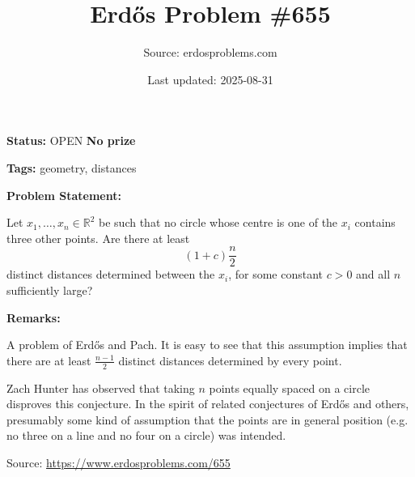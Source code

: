 \documentclass{article}
\title{Erd\H{o}s Problem \#655}
\date{Last updated: 2025-08-31}
\author{Source: erdosproblems.com}
\begin{document}
\maketitle

\noindent\textbf{Status:} OPEN \quad \textbf{No prize}

\noindent\textbf{Tags:} geometry, distances

\medskip
\noindent\textbf{Problem Statement:}

Let $x_1,\ldots,x_n\in \mathbb{R}^2$ be such that no circle whose centre is one of the $x_i$ contains three other points. Are there at least\[(1+c)\frac{n}{2}\]distinct distances determined between the $x_i$, for some constant $c>0$ and all $n$ sufficiently large?

\bigskip
\noindent\textbf{Remarks:}

A problem of Erd\H{o}s and Pach. It is easy to see that this assumption implies that there are at least $\frac{n-1}{2}$ distinct distances determined by every point.

Zach Hunter has observed that taking $n$ points equally spaced on a circle disproves this conjecture. In the spirit of related conjectures of Erd\H{o}s and others, presumably some kind of assumption that the points are in general position (e.g. no three on a line and no four on a circle) was intended.

\bigskip
\noindent\small{Source: \url{https://www.erdosproblems.com/655}}
\end{document}
